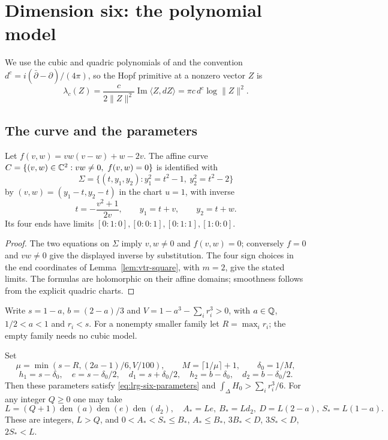 \section{Dimension six: the polynomial model}\label{sec:sxm}

We use the cubic and quadric polynomials of \cite{OpenAI2026} and the convention
$d^c=i(\bar\partial-\partial)/(4\pi)$, so the Hopf primitive at a nonzero vector $Z$ is
\[
 \lambda_c(Z)=\frac{c}{2\|Z\|^2}\operatorname{Im}\langle Z,dZ\rangle
             =\pi c\,d^c\log\|Z\|^2.
\]

\subsection{The curve and the parameters}\label{sec:sxm-curve}

\begin{lemma}\label{lem:sxm-curve}
Let $f(v,w)=vw(v-w)+w-2v$. The affine curve $C=\{(v,w)\in\C^2:vw\ne0,\ f(v,w)=0\}$ is
identified with
\[
 \Sigma=\{(t,y_1,y_2):y_1^2=t^2-1,\ y_2^2=t^2-2\}
\]
by $(v,w)=(y_1-t,y_2-t)$ in the chart $u=1$, with inverse
\[
 t=-\frac{v^2+1}{2v},\qquad y_1=t+v,\qquad y_2=t+w.
\]
Its four ends have limits $[0:1:0],[0:0:1],[0:1:1],[1:0:0]$.
\end{lemma}

\begin{proof}
The two equations on $\Sigma$ imply $v,w\ne0$ and $f(v,w)=0$; conversely $f=0$ and
$vw\ne0$ give the displayed inverse by substitution. The four sign choices in the end coordinates of Lemma~\ref{lem:vtr-square}, with $m=2$, give the stated limits. The formulas are holomorphic on their affine domains; smoothness follows from the explicit quadric charts.
\end{proof}

Write $s=1-a$, $b=(2-a)/3$ and $V=1-a^3-\sum_i r_i^3>0$, with $a\in\mathbb{Q}$, $1/2<a<1$
and $r_i<s$. For a nonempty smaller family let $R=\max_i r_i$; the empty family needs no
cubic model.

\begin{lemma}\label{lem:sxm-parameters}
Set
\[
 \mu=\min(s-R,(2a-1)/6,V/100),\qquad
 M=\lceil1/\mu\rceil+1,\qquad \delta_0=1/M,
\]
\[
 h_1=s-\delta_0,\quad e=s-\delta_0/2,\quad d_1=s+\delta_0/2,
 \quad h_2=b-\delta_0,\quad d_2=b-\delta_0/2.
\]
Then these parameters satisfy \eqref{eq:lrg-six-parameters} and $\int_\Delta H_0>\sum_i r_i^3/6$.
For any integer $Q\ge0$ one may take
\[
 L=(Q+1)\operatorname{den}(a)\operatorname{den}(e)\operatorname{den}(d_2),
 \quad A_*=Le,\ B_*=Ld_2,\ D=L(2-a),\ S_*=L(1-a).
\]
These are integers, $L>Q$, and $0<A_*<S_*\le B_*$, $A_*\le B_*$, $3B_*<D$, $3S_*<D$, $2S_*<L$.
\end{lemma}


